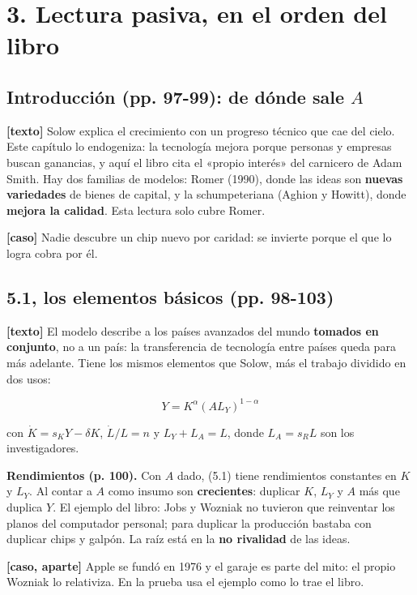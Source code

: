 \documentclass[11pt,a4paper]{article}
\begin{document}
\section*{3. Lectura pasiva, en el orden del libro}

\subsection*{Introducción (pp. 97-99): de dónde sale $A$}

\textbf{[texto]} Solow explica el crecimiento con un progreso técnico que cae del cielo. Este capítulo lo endogeniza: la tecnología mejora porque personas y empresas buscan ganancias, y aquí el libro cita el «propio interés» del carnicero de Adam Smith. Hay dos familias de modelos: Romer (1990), donde las ideas son \textbf{nuevas variedades} de bienes de capital, y la schumpeteriana (Aghion y Howitt), donde \textbf{mejora la calidad}. Esta lectura solo cubre Romer.

\textbf{[caso]} Nadie descubre un chip nuevo por caridad: se invierte porque el que lo logra cobra por él.

\subsection*{5.1, los elementos básicos (pp. 98-103)}

\textbf{[texto]} El modelo describe a los países avanzados del mundo \textbf{tomados en conjunto}, no a un país: la transferencia de tecnología entre países queda para más adelante. Tiene los mismos elementos que Solow, más el trabajo dividido en dos usos:

\begin{equation*}Y = K^\alpha (AL_Y)^{1-\alpha} \tag{5.1}\end{equation*}

con $\dot K = s_K Y - \delta K$, $\dot L/L = n$ y $L_Y + L_A = L$, donde $L_A = s_R L$ son los investigadores.

\textbf{Rendimientos (p. 100).} Con $A$ dado, (5.1) tiene rendimientos constantes en $K$ y $L_Y$. Al contar a $A$ como insumo son \textbf{crecientes}: duplicar $K$, $L_Y$ y $A$ más que duplica $Y$. El ejemplo del libro: Jobs y Wozniak no tuvieron que reinventar los planos del computador personal; para duplicar la producción bastaba con duplicar chips y galpón. La raíz está en la \textbf{no rivalidad} de las ideas.

\textbf{[caso, aparte]} Apple se fundó en 1976 y el garaje es parte del mito: el propio Wozniak lo relativiza. En la prueba usa el ejemplo como lo trae el libro.
\end{document}
